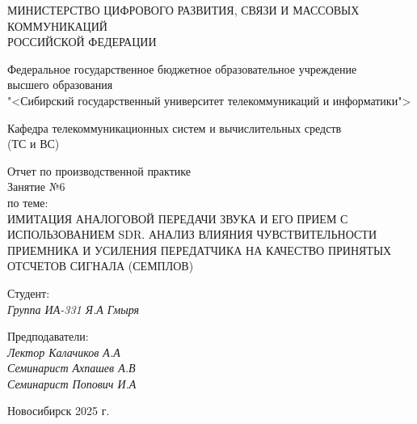 \thispagestyle{empty}

\begin{center}
    МИНИСТЕРСТВО ЦИФРОВОГО РАЗВИТИЯ, СВЯЗИ И МАССОВЫХ КОММУНИКАЦИЙ \\ РОССИЙСКОЙ ФЕДЕРАЦИИ

    \vspace{20pt}

    Федеральное государственное бюджетное образовательное учреждение  \\  высшего образования \\
    "<Сибирский государственный университет телекоммуникаций и информатики"> \\

    \vspace{20pt}

    Кафедра телекоммуникационных систем и вычислительных средств \\  (ТС и ВС)
\end{center}

\vfill

\begin{center}
    Отчет по производственной практике \\  
    Занятие №6 \\

    \vspace{20pt}
    по теме: \\
    \uppercase{Имитация аналоговой передачи звука и его прием с использованием SDR. Анализ влияния чувствительности приемника 
    и усиления передатчика на качество принятых отсчетов сигнала (семплов)}
\end{center}

\vfill

    \noindent Студент: \\
    \textit{Группа ИА-331 \hfill Я.А Гмыря}

    \vspace{20pt}

    \noindent Предподаватели: \\
    \textit{Лектор \hfill Калачиков А.А} \\
    \textit{Семинарист \hfill Ахпашев А.В} \\
    \textit{Семинарист \hfill Попович И.А}

\vfill

\begin{center}
    Новосибирск 2025 г.
\end{center}